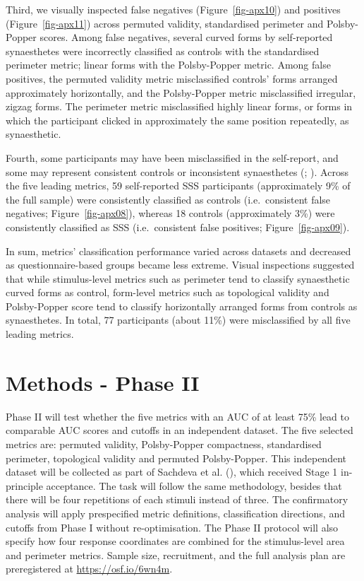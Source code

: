 \documentclass[
  man,
  floatsintext,
  longtable,
  nolmodern,
  notxfonts,
  notimes,
  colorlinks=true,linkcolor=blue,citecolor=blue,urlcolor=blue]{apa7}
\begin{document}
Third, we visually inspected false negatives (Figure~\ref{fig-apx10})
and positives (Figure~\ref{fig-apx11}) across permuted validity,
standardised perimeter and Polsby-Popper scores. Among false negatives,
several curved forms by self-reported synaesthetes were incorrectly
classified as controls with the standardised perimeter metric; linear
forms with the Polsby-Popper metric. Among false positives, the permuted
validity metric misclassified controls' forms arranged approximately
horizontally, and the Polsby-Popper metric misclassified irregular,
zigzag forms. The perimeter metric misclassified highly linear forms, or
forms in which the participant clicked in approximately the same
position repeatedly, as synaesthetic.

Fourth, some participants may have been misclassified in the
self-report, and some may represent consistent controls or inconsistent
synaesthetes (;
). Across the five leading
metrics, 59 self-reported SSS participants (approximately 9\% of the
full sample) were consistently classified as controls (i.e.~consistent
false negatives; Figure~\ref{fig-apx08}), whereas 18 controls
(approximately 3\%) were consistently classified as SSS (i.e.~consistent
false positives; Figure~\ref{fig-apx09}).

In sum, metrics' classification performance varied across datasets and
decreased as questionnaire-based groups became less extreme. Visual
inspections suggested that while stimulus-level metrics such as
perimeter tend to classify synaesthetic curved forms as control,
form-level metrics such as topological validity and Polsby-Popper score
tend to classify horizontally arranged forms from controls as
synaesthetes. In total, 77 participants (about 11\%) were misclassified
by all five leading metrics.

\section{Methods - Phase II}\label{sec-phase-ii-methods}

Phase II will test whether the five metrics with an AUC of at least 75\%
lead to comparable AUC scores and cutoffs in an independent dataset. The
five selected metrics are: permuted validity, Polsby-Popper compactness,
standardised perimeter, topological validity and permuted Polsby-Popper.
This independent dataset will be collected as part of Sachdeva et al.
(), which received Stage 1 in-principle
acceptance. The task will follow the same methodology, besides that
there will be four repetitions of each stimuli instead of three. The
confirmatory analysis will apply prespecified metric definitions,
classification directions, and cutoffs from Phase I without
re-optimisation. The Phase II protocol will also specify how four
response coordinates are combined for the stimulus-level area and
perimeter metrics. Sample size, recruitment, and the full analysis plan
are preregistered at \url{https://osf.io/6wn4m}.
\end{document}
